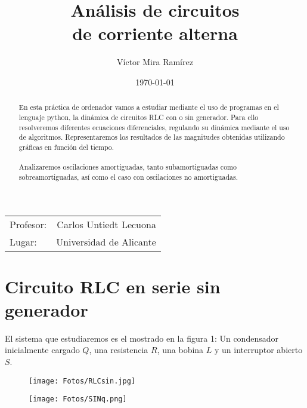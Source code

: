 \documentclass{article}
\title{\textbf{Análisis de circuitos \\ de corriente alterna}}
\author{Víctor Mira Ramírez}
\date{\today}
\begin{document}
\maketitle

\begin{center}
\begin{tabular}{l r}

Profesor: & Carlos Untiedt Lecuona\\
Lugar: & Universidad de Alicante
\end{tabular}
\end{center}

\vspace{2cm}
\tableofcontents

\vspace{2cm}
\begin{abstract}
\noindent En esta práctica de ordenador vamos a estudiar mediante el uso de programas en el lenguaje python, la dinámica de circuitos RLC con o sin generador. Para ello resolveremos diferentes ecuaciones diferenciales, regulando su dinámica mediante el uso de algoritmos. Representaremos los resultados de las magnitudes obtenidas utilizando gráficas en función del tiempo.\\ \\Analizaremos oscilaciones amortiguadas, tanto subamortiguadas como sobreamortiguadas, así como el caso con oscilaciones no amortiguadas.
\end{abstract}
    
\clearpage
    
\section{Circuito RLC en serie sin generador}
    El sistema que estudiaremos es el mostrado en la figura 1: Un condensador inicialmente cargado $Q$, una resistencia $R$, una bobina $L$ y un interruptor abierto $S$.

    \begin{figure}[h]
        \centering
        \begin{minipage}{.5\textwidth}
            \centering
            \texttt{[image: Fotos/RLCsin.jpg]}
        \end{minipage}%
        \begin{minipage}{.5\textwidth}
            \centering
            \texttt{[image: Fotos/SINq.png]}
        \end{minipage}
    \end{figure}
\end{document}

